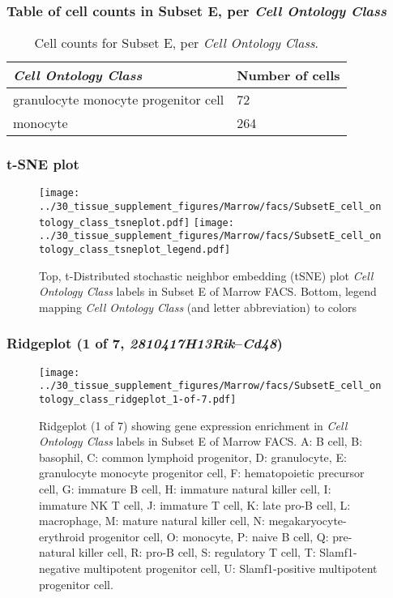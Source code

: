 \subsubsection{Table of cell counts in Subset E, per \emph{Cell Ontology Class}}\begin{table}[h]
\centering
\label{my-label}
\begin{tabular}{@{}ll@{}}
\toprule

\emph{Cell Ontology Class}& Number of cells \\ \midrule
granulocyte monocyte progenitor cell & 72 \\

monocyte & 264 \\
\bottomrule
\end{tabular}
\caption{Cell counts for Subset E, per \emph{Cell Ontology Class}.}
\end{table}

\clearpage
\subsubsection{t-SNE plot}
\begin{figure}[h]
\centering
\texttt{[image: ../30\_tissue\_supplement\_figures/Marrow/facs/SubsetE\_cell\_ontology\_class\_tsneplot.pdf]}
\texttt{[image: ../30\_tissue\_supplement\_figures/Marrow/facs/SubsetE\_cell\_ontology\_class\_tsneplot\_legend.pdf]}
\caption{Top, t-Distributed stochastic neighbor embedding (tSNE) plot  \emph{Cell Ontology Class} labels in Subset E of Marrow FACS. Bottom, legend mapping \emph{Cell Ontology Class} (and letter abbreviation) to colors}
\end{figure}


\clearpage

\subsubsection{Ridgeplot (1 of 7, \emph{2810417H13Rik}--\emph{Cd48})}
\begin{figure}[h]
\centering
\texttt{[image: ../30\_tissue\_supplement\_figures/Marrow/facs/SubsetE\_cell\_ontology\_class\_ridgeplot\_1-of-7.pdf]}

\caption{ Ridgeplot (1 of 7)  showing gene expression enrichment in \emph{Cell Ontology Class} labels in Subset E of Marrow FACS. A: B cell, B: basophil, C: common lymphoid progenitor, D: granulocyte, E: granulocyte monocyte progenitor cell, F: hematopoietic precursor cell, G: immature B cell, H: immature natural killer cell, I: immature NK T cell, J: immature T cell, K: late pro-B cell, L: macrophage, M: mature natural killer cell, N: megakaryocyte-erythroid progenitor cell, O: monocyte, P: naive B cell, Q: pre-natural killer cell, R: pro-B cell, S: regulatory T cell, T: Slamf1-negative multipotent progenitor cell, U: Slamf1-positive multipotent progenitor cell.}
\end{figure}


